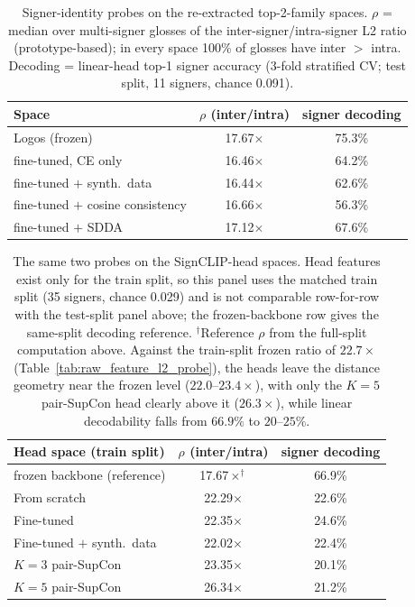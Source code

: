 \begin{table}[t]
\centering
\small
\begin{tabular}{lcc}
\toprule
\textbf{Space} & \textbf{$\rho$ (inter/intra)} & \textbf{signer decoding} \\
\midrule
Logos (frozen) & 17.67$\times$ & 75.3\% \\
fine-tuned, CE only       & 16.46$\times$ & 64.2\% \\
fine-tuned $+$ synth.\ data & 16.44$\times$ & 62.6\% \\
fine-tuned $+$ cosine consistency & 16.66$\times$ & 56.3\% \\
fine-tuned $+$ SDDA       & 17.12$\times$ & 67.6\% \\
\bottomrule
\end{tabular}
\caption[Signer-identity probes on the fine-tuned spaces]{Signer-identity probes on the re-extracted top-2-family spaces.
$\rho$ = median over multi-signer glosses of the inter-signer/intra-signer
L2 ratio (prototype-based); in every space 100\% of glosses have
inter $>$ intra. Decoding = linear-head top-1 signer accuracy
(3-fold stratified CV; test split, 11 signers, chance 0.091).}
\label{tab:signer_probes}
\end{table}

\begin{table}[t]
\centering
\small
\begin{tabular}{lcc}
\toprule
\textbf{Head space (train split)} & \textbf{$\rho$ (inter/intra)} & \textbf{signer decoding} \\
\midrule
frozen backbone (reference)        & 17.67$\times^{\dagger}$ & 66.9\% \\
From scratch                       & 22.29$\times$ & 22.6\% \\
Fine-tuned                         & 22.35$\times$ & 24.6\% \\
Fine-tuned $+$ synth.\ data        & 22.02$\times$ & 22.4\% \\
$K{=}3$ pair-SupCon                & 23.35$\times$ & 20.1\% \\
$K{=}5$ pair-SupCon                & 26.34$\times$ & 21.2\% \\
\bottomrule
\end{tabular}
\caption[Signer-identity probes on the SignCLIP-head spaces]{The same two probes on the SignCLIP-head spaces. Head features
exist only for the train split, so this panel uses the matched train
split (35 signers, chance 0.029) and is not comparable row-for-row with
the test-split panel above; the frozen-backbone row gives the same-split
decoding reference. $^{\dagger}$Reference $\rho$ from the full-split
computation above. Against the train-split frozen ratio of $22.7\times$
(Table~\ref{tab:raw_feature_l2_probe}), the heads leave the distance
geometry near the frozen level ($22.0$--$23.4\times$), with only the
$K{=}5$ pair-SupCon head clearly above it ($26.3\times$), while linear
decodability falls from $66.9\%$ to $20$--$25\%$.}
\label{tab:head_signer_probes}
\end{table}



